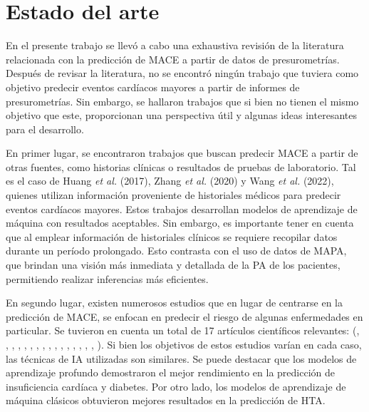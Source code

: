 
\section{Estado del arte}

En el presente trabajo se llevó a cabo una exhaustiva revisión de la literatura relacionada con la predicción 
de MACE a partir de datos de presurometrías.
Después de revisar la literatura, no se encontró ningún trabajo que tuviera como objetivo predecir eventos 
cardíacos mayores a partir de informes de presurometrías. Sin embargo, se hallaron trabajos que si bien no 
tienen el mismo objetivo que este, proporcionan una perspectiva útil y algunas ideas interesantes
 para el desarrollo.

En primer lugar, se encontraron trabajos que buscan predecir MACE a partir de otras fuentes, como historias clínicas 
o resultados de pruebas de laboratorio. Tal es el caso de Huang \emph{et al.} (2017), Zhang \emph{et al.} (2020) y 
Wang \emph{et al.} (2022), quienes utilizan información proveniente de historiales médicos para predecir eventos 
cardíacos mayores. Estos trabajos desarrollan modelos de aprendizaje de máquina con resultados aceptables. 
Sin embargo, es importante tener en cuenta que 
al emplear información de historiales clínicos se requiere recopilar datos durante un período prolongado. 
Esto contrasta con el uso de datos de MAPA, que brindan una visión más inmediata y detallada de la PA de los pacientes, 
permitiendo realizar inferencias más eficientes.

En segundo lugar, existen numerosos estudios que en lugar de centrarse en la predicción de MACE, se enfocan en 
predecir el riesgo de algunas enfermedades en particular. Se tuvieron en cuenta un total de 17 artículos científicos 
relevantes: (\cite{Mortazavi2016}, \cite{Voors2017}, \cite{Samuel2017}, \cite{Weng2017}, \cite{Bowen2017}, 
\cite{Lorenzoni2019}, \cite{Kwon20191}, \cite{Kwon20192}, \cite{Kwon20193}, \cite{Lim2019}, \cite{Chen2019}, 
\cite{Awan2019}, \cite{Chicco2020}, \cite{Adler2020}, \cite{Javeed2020}, \cite{Cohen2021}, \cite{Rao2021}).  
Si bien los objetivos de estos estudios varían en cada caso, las técnicas de IA utilizadas son similares. 
Se puede destacar que los modelos de aprendizaje profundo demostraron el mejor rendimiento en la predicción de 
insuficiencia cardíaca y diabetes. Por otro lado, los modelos de aprendizaje de máquina clásicos obtuvieron 
mejores resultados en la predicción de HTA.

